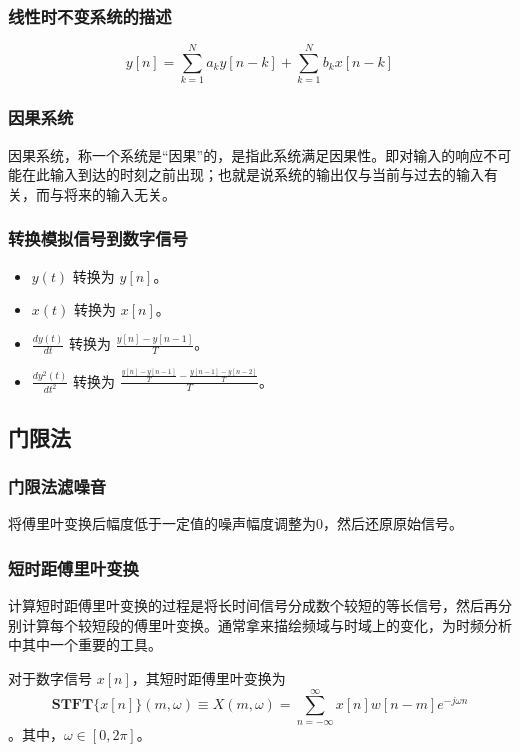 \documentclass{ctexbeamer}
\begin{document}
	\begin{frame}
		\frametitle{线性时不变系统的描述}
		\begin{definition}[线性时不变系统]
			$$y[n]=\sum_{k=1}^{N}a_k y[n-k]+\sum_{k=1}^{N}b_k x[n-k]$$
		\end{definition}
	\end{frame}

	\begin{frame}
		\frametitle{因果系统}
		\begin{definition}[因果]
			因果系统，称一个系统是“因果”的，是指此系统满足因果性。即对输入的响应不可能在此输入到达的时刻之前出现；也就是说系统的输出仅与当前与过去的输入有关，而与将来的输入无关。
		\end{definition}
	\end{frame}

	\begin{frame}
		\frametitle{转换模拟信号到数字信号}
		\begin{itemize}
			\item $y(t)$ 转换为 $y[n]$。
			\item $x(t)$ 转换为 $x[n]$。
			\item $\frac{dy(t)}{dt}$ 转换为 $\frac{y[n]-y[n-1]}{T}$。
			\item $\frac{dy^2(t)}{dt^2}$ 转换为 $\frac{\frac{y[n]-y[n-1]}{T}-\frac{y[n-1]-y[n-2]}{T}}{T}$。
		\end{itemize}
	\end{frame}

	\subsection{门限法}

	\begin{frame}
		\frametitle{门限法滤噪音}
		将傅里叶变换后幅度低于一定值的噪声幅度调整为$0$，然后还原原始信号。
	\end{frame}

	\begin{frame}
		\frametitle{短时距傅里叶变换}
		计算短时距傅里叶变换的过程是将长时间信号分成数个较短的等长信号，然后再分别计算每个较短段的傅里叶变换。通常拿来描绘频域与时域上的变化，为时频分析中其中一个重要的工具。 
		\begin{definition}[短时距傅里叶变换]
			对于数字信号 $x[n]$，其短时距傅里叶变换为 $$\mathbf{STFT}\{x[n]\}(m,\omega)\equiv X(m,\omega) = \sum_{n=-\infty}^{\infty} x[n]w[n-m]e^{-j \omega n} $$。其中，$\omega\in [0,2\pi]$。
		\end{definition}
	\end{frame}
\end{document}
